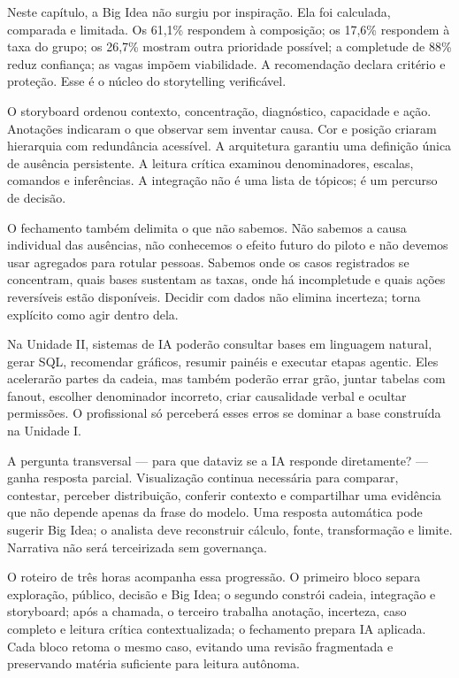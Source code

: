 Neste capítulo, a Big Idea não surgiu por inspiração. Ela foi calculada, comparada e limitada. Os 61,1\% respondem à composição; os 17,6\% respondem à taxa do grupo; os 26,7\% mostram outra prioridade possível; a completude de 88\% reduz confiança; as vagas impõem viabilidade. A recomendação declara critério e proteção. Esse é o núcleo do storytelling verificável.

O storyboard ordenou contexto, concentração, diagnóstico, capacidade e ação. Anotações indicaram o que observar sem inventar causa. Cor e posição criaram hierarquia com redundância acessível. A arquitetura garantiu uma definição única de ausência persistente. A leitura crítica examinou denominadores, escalas, comandos e inferências. A integração não é uma lista de tópicos; é um percurso de decisão.

O fechamento também delimita o que não sabemos. Não sabemos a causa individual das ausências, não conhecemos o efeito futuro do piloto e não devemos usar agregados para rotular pessoas. Sabemos onde os casos registrados se concentram, quais bases sustentam as taxas, onde há incompletude e quais ações reversíveis estão disponíveis. Decidir com dados não elimina incerteza; torna explícito como agir dentro dela.

Na Unidade II, sistemas de IA poderão consultar bases em linguagem natural, gerar SQL, recomendar gráficos, resumir painéis e executar etapas agentic. Eles acelerarão partes da cadeia, mas também poderão errar grão, juntar tabelas com fanout, escolher denominador incorreto, criar causalidade verbal e ocultar permissões. O profissional só perceberá esses erros se dominar a base construída na Unidade I.

A pergunta transversal --- para que dataviz se a IA responde diretamente? --- ganha resposta parcial. Visualização continua necessária para comparar, contestar, perceber distribuição, conferir contexto e compartilhar uma evidência que não depende apenas da frase do modelo. Uma resposta automática pode sugerir Big Idea; o analista deve reconstruir cálculo, fonte, transformação e limite. Narrativa não será terceirizada sem governança.

O roteiro de três horas acompanha essa progressão. O primeiro bloco separa exploração, público, decisão e Big Idea; o segundo constrói cadeia, integração e storyboard; após a chamada, o terceiro trabalha anotação, incerteza, caso completo e leitura crítica contextualizada; o fechamento prepara IA aplicada. Cada bloco retoma o mesmo caso, evitando uma revisão fragmentada e preservando matéria suficiente para leitura autônoma.

